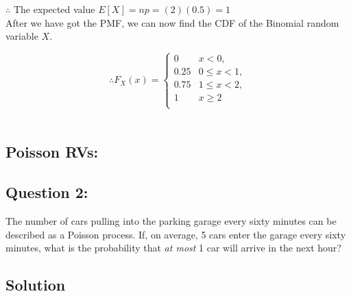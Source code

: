 \documentclass[12pt]{report} %
\begin{document}
\noindent $\therefore$ The expected value $E[X] = np = (2)(0.5) = 1$ \\

\noindent After we have got the PMF, we can now find the CDF of the
Binomial random variable $X$. \\

\begin{multicols}{2}
\[
\therefore F_X(x) =
\begin{cases}
0 & x < 0, \\
0.25 & 0 \le x < 1, \\
0.75 & 1 \le x < 2, \\
1 & x \ge 2 \\
\end{cases}
\]
\columnbreak
\\
\end{multicols}

\newpage

\subsection*{Poisson RVs:}
\subsection*{Question 2:}

\noindent The number of cars pulling into the parking garage every
sixty minutes can be described as a Poisson process. If, on average,
5 cars enter the garage every sixty minutes, what is the probability
that \textit{at most} 1 car will arrive in the next hour?

\subsection*{Solution}
\end{document}
